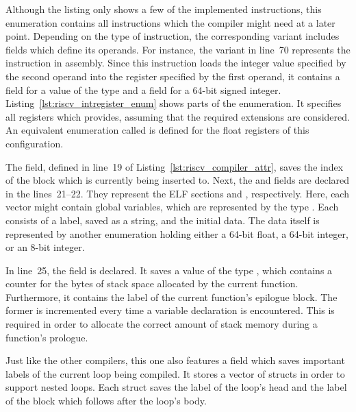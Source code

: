 Although the listing only shows a few of the implemented instructions,
this enumeration contains all instructions which the compiler might need at a later point.
Depending on the type of instruction, the corresponding variant includes fields which define its operands.
For instance, the  variant in line~70 represents the  instruction in assembly.
Since this instruction loads the integer value specified by the second operand into the register specified by the first operand,
it contains a field for a value of the type  and a field for a 64-bit signed integer.
Listing~\ref{lst:riscv_intregister_enum} shows parts of the  enumeration.
It specifies all registers which \riscv{} provides, assuming that the required extensions are considered.
An equivalent enumeration called  is defined for the float registers of this \riscv{} configuration.


The  field, defined in line~19 of Listing~\ref{lst:riscv_compiler_attr},
saves the index of the block which is currently being inserted to.
Next, the  and  fields are declared in the lines~21--22.
They represent the ELF sections  and , respectively.
Here, each vector might contain global variables, which are represented by the type .
Each  consists of a label, saved as a string, and the initial data.
The data itself is represented by another enumeration holding either a 64-bit float, a 64-bit integer, or an 8-bit integer.

In line~25, the  field is declared.
It saves a value of the type , which contains a counter for the bytes of stack space allocated by the current function.
Furthermore, it contains the label of the current function's epilogue block.
The former is incremented every time a variable declaration is encountered.
This is required in order to allocate the correct amount of stack memory during a function's prologue.

Just like the other compilers, this one also features a  field which saves important labels of the current loop being compiled.
It stores a vector of  structs in order to support nested loops.
Each  struct saves the label of the loop's head and the label of the block which follows after the loop's body.

